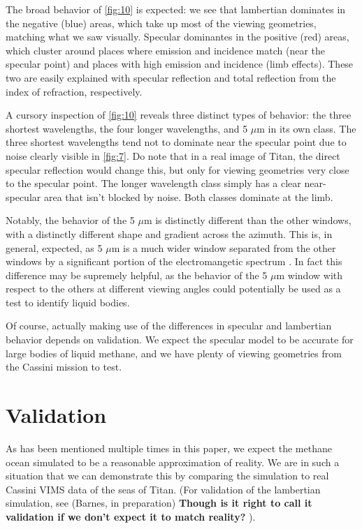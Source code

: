 \documentclass[twocolumn,linenumbers]{aastex631}
\begin{document}
The broad behavior of \ref{fig:10} is expected: we see that lambertian dominates in the negative (blue) areas, which take up most of the viewing geometries, matching what we saw visually. Specular dominantes in the positive (red) areas, which cluster around places where emission and incidence match (near the specular point) and places with high emission and incidence (limb effects). These two are easily explained with specular reflection and total reflection from the index of refraction, respectively.

A cursory inspection of \ref{fig:10} reveals three distinct types of behavior: the three shortest wavelengths, the four longer wavelengths, and 5 $\mu$m in its own class. The three shortest wavelengths tend not to dominate near the specular point due to noise clearly visible in \ref{fig:7}. Do note that in a real image of Titan, the direct specular reflection would change this, but only for viewing geometries very close to the specular point. The longer wavelength class simply has a clear near-specular area that isn't blocked by noise. Both classes dominate at the limb. 

Notably, the behavior of the 5 $\mu$m is distinctly different than the other windows, with a distinctly different shape and gradient across the azimuth. This is, in general, expected, as 5 $\mu$m is a much wider window separated from the other windows by a significant portion of the electromangetic spectrum \citep{EsSayeh2023}. In fact this difference may be supremely helpful, as the behavior of the 5 $\mu$m window with respect to the others at different viewing angles could potentially be used as a test to identify liquid bodies. 

Of course, actually making use of the differences in specular and lambertian behavior depends on validation. We expect the specular model to be accurate for large bodies of liquid methane, and we have plenty of viewing geometries from the Cassini mission to test.

\section{Validation} \label{sec:validation}

As has been mentioned multiple times in this paper, we expect the methane ocean simulated to be a reasonable approximation of reality. We are in such a situation that we can demonstrate this by comparing the simulation to real Cassini VIMS data of the seas of Titan. (For validation of the lambertian simulation, see (Barnes, in preparation) \textbf{\color{red} Though is it right to call it validation if we don't expect it to match reality? \color{black}}). 
\end{document}
